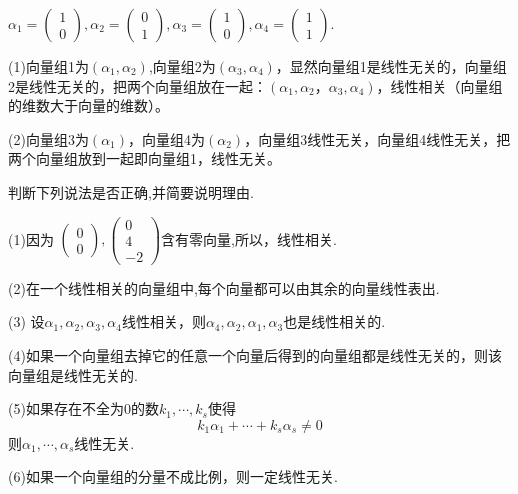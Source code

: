 \documentclass[a4paper]{report}
\begin{document}
\begin{jie}
$\alpha_1=
\begin{pmatrix}
1\\ 0
\end{pmatrix}
,\alpha_2=
\begin{pmatrix}
0\\ 1
\end{pmatrix},\alpha_3=
\begin{pmatrix}
1\\ 0
\end{pmatrix},\alpha_4=
\begin{pmatrix}
1\\ 1
\end{pmatrix}$.

(1)向量组1为$(\alpha_1,\alpha_2)$,向量组2为$(\alpha_3,\alpha_4)$，显然向量组1是线性无关的，向量组2是线性无关的，把两个向量组放在一起：$(\alpha_1,\alpha_2，\alpha_3,\alpha_4)$，线性相关（向量组的维数大于向量的维数）。

(2)向量组3为$(\alpha_1)$，向量组4为$(\alpha_2)$，向量组3线性无关，向量组4线性无关，把两个向量组放到一起即向量组1，线性无关。
\end{jie}

\EX 判断下列说法是否正确,并简要说明理由.

(1)因为
$
\begin{pmatrix}
0\\ 0
\end{pmatrix},\begin{pmatrix}
               0\\ 4\\ -2
              \end{pmatrix}
$含有零向量,所以，线性相关.

(2)在一个线性相关的向量组中,每个向量都可以由其余的向量线性表出.

(3) 设$\alpha_1,\alpha_2,\alpha_3,\alpha_4$线性相关，则$\alpha_4,\alpha_2,\alpha_1,\alpha_3$也是线性相关的.

(4)如果一个向量组去掉它的任意一个向量后得到的向量组都是线性无关的，则该向量组是线性无关的.

(5)如果存在不全为$0$的数$k_1,\cdots,k_s$使得
\begin{equation*}
  k_1\alpha_1+\cdots+k_s\alpha_s\neq0
\end{equation*}
则$\alpha_1,\cdots,\alpha_s$线性无关.

(6)如果一个向量组的分量不成比例，则一定线性无关.
\end{document}
